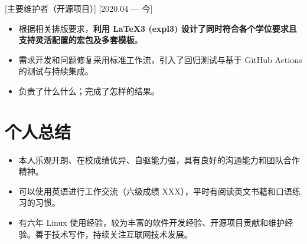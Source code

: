\documentclass{resume}
\begin{document}
[主要维护者（开源项目）]
[2020.04 — 今]

\begin{itemize}
  \item 根据相关排版要求，\textbf{利用 LaTeX3 (expl3) 设计了同时符合各个学位要求且支持灵活配置的宏包及多套模板}。
  \item 需求开发和问题修复采用标准工作流，引入了回归测试与基于 GitHub Actions 的测试与持续集成。
  \item 负责了什么什么；完成了怎样的结果。
\end{itemize}

\section{个人总结}

\begin{itemize}
  \item 本人乐观开朗、在校成绩优异、自驱能力强，具有良好的沟通能力和团队合作精神。
  \item 可以使用英语进行工作交流（六级成绩 XXX），平时有阅读英文书籍和口语练习的习惯。
  \item 有六年 Linux 使用经验，较为丰富的软件开发经验、开源项目贡献和维护经验。善于技术写作，持续关注互联网技术发展。
\end{itemize}
\end{document}
